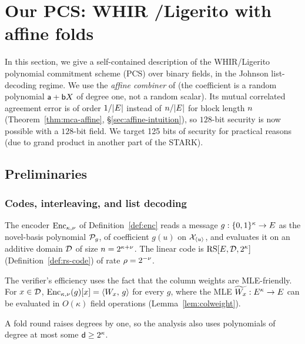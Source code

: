 \section{Our PCS: WHIR \slash Ligerito with affine folds}\label{annex:pcs}

In this section, we give a self-contained description of the WHIR\slash Ligerito polynomial commitment scheme (PCS) \cite{ACFY25,NA25} over binary fields, in the Johnson list-decoding regime. We use the \emph{affine combiner} of \cite{CWYZ26} (the coefficient is a random polynomial $\mathsf{a}+\mathsf{b} X$ of degree one, not a random scalar). Its mutual correlated agreement error is of order $1/|E|$ instead of $n/|E|$ for block length $n$ (Theorem~\ref{thm:mca-affine}, \S\ref{sec:affine-intuition}), so $128$-bit security is now possible with a $128$-bit field. We target 125 bits of security for practical reasons (due to grand product in another part of the STARK).

\subsection{Preliminaries}\label{sec:prelims}

\subsubsection{Codes, interleaving, and list decoding}\label{sec:codes}\label{sec:binary-rs}

The encoder $\mathrm{Enc}_{\kappa,\nu}$ of Definition~\ref{def:enc} reads a message $g:\{0,1\}^{\kappa}\to E$ as the novel-basis polynomial $\mathcal{P}_g$, of coefficient $g(u)$ on $\mathcal{X}_{\langle u\rangle}$, and evaluates it on an additive domain $\mathcal{D}$ of size $n=2^{\kappa+\nu}$. The linear code is $\mathrm{RS}[E,\mathcal{D},2^\kappa]$ (Definition~\ref{def:rs-code}) of rate $\rho=2^{-\nu}$.

The verifier's efficiency uses the fact that the column weights are MLE-friendly. For $x\in\mathcal{D}$, $\mathrm{Enc}_{\kappa,\nu}(g)[x]=\langle W_x,\, g \rangle$ for every $g$, where the MLE $\widetilde{W_x}: E^\kappa \to E$ can be evaluated in $O(\kappa)$ field operations (Lemma~\ref{lem:colweight}).

A fold round raises degrees by one, so the analysis also uses polynomials of degree at most some $\mathsf{d}\ge2^\kappa$.

